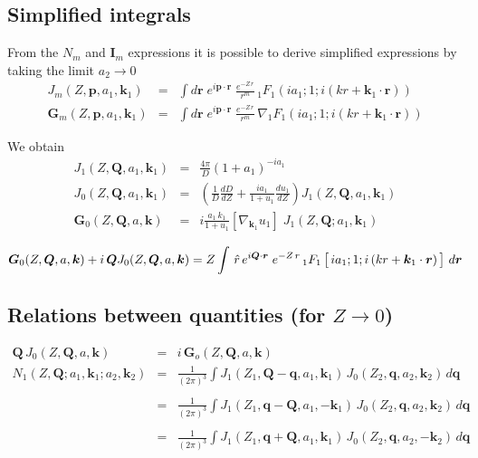 \subsection{Simplified integrals}
From the $N_{m}$ and $\bm{I}_{m}$ expressions it is possible to derive
simplified expressions by taking the limit $a_{2} \to 0$
%
\begin{eqnarray}\label{Q:Jm}%
 J_{m}( Z, \bm{p}, a_{1}, \bm{k}_{1} ) &=&
\int d \bm{r} \; e^{i \bm{p} \cdot \bm{r}} \; \frac{e^{- Z
\, r}}{r^{m}} \, {_{1}F_{1}} \left( i a_{1} ; 1 ;i \left(k r +
\bm{k}_{1}\cdot \bm{r} \right)\right) \\
\bm{G}_{m}( Z, \bm{p}, a_{1}, \bm{k}_{1} ) &=& \int d \bm{r} \;
e^{i \bm{p} \cdot \bm{r}} \; \frac{e^{- Z \, r}}{r^{m}} \,
\nabla {_{1}F_{1}} \left( i a_{1} ; 1 ;i \left(k r +
\bm{k}_{1}\cdot \bm{r} \right)\right)
\end{eqnarray}

  \noindent
We obtain
\begin{eqnarray}\label{Q:Jint}
J_{1}( Z, \bm{Q}, a_{1}, \bm{k}_{1} ) &=& \frac{4 \pi}{D} (1+a_{1})^{-
i a_{1}}
\\
J_{0}( Z, \bm{Q}, a_{1}, \bm{k}_{1} ) &=& \left( \frac{1}{D} \frac{d
D}{d Z} + \frac{i a_{1}}{1 + u_{1}} \frac{d u_{1}}{d Z}
\right) J_{1}( Z, \bm{Q}, a_{1}, \bm{k}_{1} ) \\
\bm{G}_{0}( Z, \bm{Q}, a, \bm{k} ) &=&  i  \frac{ a_{1}\, k_{1}}{1 +
u_{1}} \left[ \nabla_{\bm{k}_{1}} u_{1} \right] \; J_{1}(Z,\bm{Q};
a_{1},\bm{k}_{1})
\end{eqnarray}

\begin{equation}\label{Q:G_if}
\bm{G}_{0}( Z, \bm{Q}, a, \bm{k} ) + i\, \bm{Q} J_{0}( Z, \bm{Q}, a,
\bm{k} ) = Z \int \,\hat{r} \,e^{i \bm{Q} \cdot \bm{r}} \;
e^{- Z \, r} \, {_{1}F_{1}} \left[\, i a_{1} ; 1 ;i \left(k r
+ \bm{k}_{1}\cdot \bm{r} \right) \vstretch \right]\, d \bm{r}
\end{equation}
%

\subsection{Relations between quantities (for $Z \to 0$)}
%
\begin{eqnarray} \label{Q-N1-Ja}
\bm{Q} \, J_{0}(Z , \bm{Q}, a , \bm{k}) &=& i \, \bm{G}_{o} (Z ,
\bm{Q}, a , \bm{k}) \qquad \qquad
 \\
N_{1} \left(Z,  \bm{Q} ; a_{1}, \bm{k}_{1} ; a_{2}, \bm{k}_{2} \right)
&=&  \frac{1}{(2 \pi)^{3}} \int J_{1}(Z_{1}, \bm{Q}
-\bm{q},a_{1},\bm{k}_{1}) \, J_{0}(Z_{2},  \bm{q} ,a_{2},\bm{k}_{2} )
\, d \bm{q}
 \nonumber \\ \\ \label{Q-N1-Jb}
&=& \frac{1}{(2 \pi)^{3}} \int J_{1}(Z_{1},\bm{q} - \bm{Q}, a_{1},-
\bm{k}_{1}) \, J_{0}(Z_{2}, \bm{q} ,a_{2},\bm{k}_{2} ) \, d \bm{q}
 \nonumber \\ \\ \label{Q-N1-Jc}
&=& \frac{1}{(2 \pi)^{3}} \int J_{1}( Z_{1}, \bm{q} + \bm{Q}, a_{1},
\bm{k}_{1} ) \, J_{0}(Z_{2}, \bm{q}  ,a_{2},-\bm{k}_{2} ) \, d
\bm{q}
\nonumber \\
\end{eqnarray}

